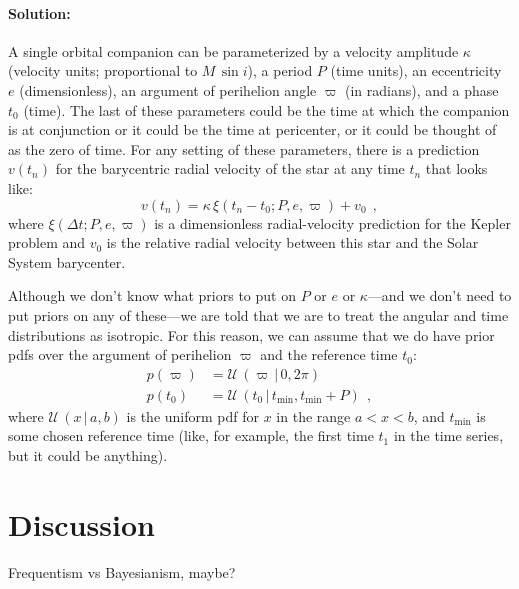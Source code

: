 \documentclass[10pt, letterpaper]{article}
\newcommand{\hquad}{~~}
\newcommand{\given}{\,|\,}
\newcommand{\uniform}{\mathcal{U}\!\,}
\begin{document}
\paragraph{Solution:}
A single orbital companion can be parameterized by a velocity
amplitude $\kappa$ (velocity units; proportional to $M\,\sin i$), a
period $P$ (time units), an eccentricity $e$ (dimensionless), an
argument of perihelion angle $\varpi$ (in radians), and a phase $t_0$
(time). The last of these parameters could be the time at which the
companion is at conjunction or it could be the time at pericenter, or
it could be thought of as the zero of time. For any setting of these
parameters, there is a prediction $v(t_n)$ for the barycentric radial velocity of
the star at any time $t_n$ that looks like:
\begin{equation}
  v(t_n) = \kappa\,\xi(t_n - t_0; P, e, \varpi) + v_0
  \hquad,
\end{equation}
where $\xi(\Delta t; P, e, \varpi)$ is a dimensionless radial-velocity
prediction for the Kepler problem and $v_0$ is the relative radial
velocity between this star and the Solar System barycenter.

Although we don't know what priors to put on $P$ or $e$ or $\kappa$---and
we don't need to put priors on any of these---we are told that we are to
treat the angular and time distributions as isotropic.
For this reason, we can assume that we do have prior pdfs over
the argument of perihelion $\varpi$ and the reference time $t_0$:
\begin{align}
  p(\varpi) &= \uniform(\varpi\given 0, 2\pi) \\
  p(t_0) &= \uniform(t_0\given t_{\min}, t_{\min}+P)
  \hquad ,
\end{align}
where $\uniform(x\given a,b)$ is the uniform pdf for $x$ in the range $a<x<b$,
and $t_{\min}$ is some chosen reference time (like, for example, the
first time $t_1$ in the time series, but it could be anything).

\section{Discussion}

Frequentism vs Bayesianism, maybe?

\clearmargin\clearpage\raggedright

\end{document}
